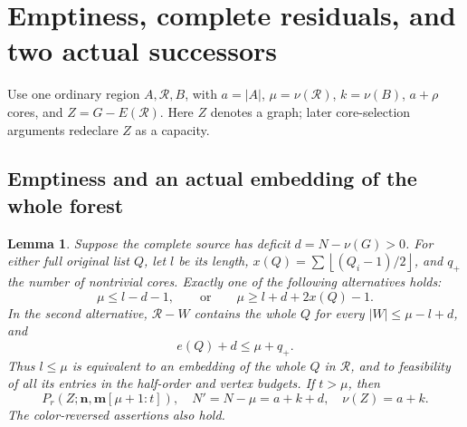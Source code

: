 \documentclass[11pt,a4paper]{article}
\newcommand{\nn}{\mathbf n}\newcommand{\mm}{\mathbf m}
\newcommand{\floor}[1]{\left\lfloor#1\right\rfloor}
\newtheorem{lemma}[theorem]{Lemma}
\theoremstyle{definition}
\begin{document}
\section{Emptiness, complete residuals, and two actual successors}\label{app:sources}
Use one ordinary region $A,\mathcal R,B$, with $a=|A|$, $\mu=\nu(\mathcal R)$, $k=\nu(B)$, $a+\rho$ cores, and $Z=G-E(\mathcal R)$. Here $Z$ denotes a graph; later core-selection arguments redeclare $Z$ as a capacity.

\subsection{Emptiness and an actual embedding of the whole forest}
\begin{lemma}\label{lem:empty-embedding}
Suppose the complete source has deficit $d=N-\nu(G)>0$. For either full original list $Q$, let $l$ be its length, $x(Q)=\sum\floor{(Q_i-1)/2}$, and $q_+$ the number of nontrivial cores. Exactly one of the following alternatives holds:
\[
 \mu\le l-d-1,\qquad\text{or}\qquad\mu\ge l+d+2x(Q)-1.
\]
In the second alternative, $\mathcal R-W$ contains the whole $Q$ for every $|W|\le\mu-l+d$, and
\[
 e(Q)+d\le\mu+q_+.
\]
Thus $l\le\mu$ is equivalent to an embedding of the whole $Q$ in $\mathcal R$, and to feasibility of all its entries in the half-order and vertex budgets. If $t>\mu$, then
\[
 P_r(Z;\nn,\mm[\mu+1:t]),\quad N'=N-\mu=a+k+d,
 \quad\nu(Z)=a+k.
\]
The color-reversed assertions also hold.
\end{lemma}
\end{document}
